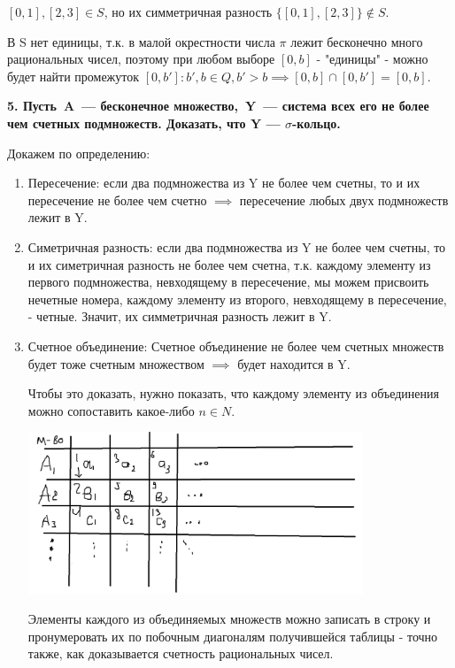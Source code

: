 \documentclass{article}
\begin{document}
$[0,1], [2,3] \in S$, но их симметричная разность $\{[0,1], [2,3]\} \notin S$.

В S нет единицы, т.к. в малой окрестности числа $\pi$ лежит бесконечно много рациональных чисел, поэтому при любом выборе $[0,b]$ - "единицы" - можно будет найти промежуток $[0,b'] : b', b \in Q, b' > b \implies [0,b] \cap [0,b'] = [0,b]$.

\noindent \textbf{5. Пусть A — бесконечное множество, Y — система всех его не более чем счетных подмножеств. Доказать, что Y — $\sigma$-кольцо.}

Докажем по определению:

\begin{enumerate}

\item Пересечение: если два подмножества из Y не более чем счетны, то и их пересечение не более чем счетно $\implies$ пересечение любых двух подмножеств лежит в Y.

\item Симетричная разность: если два подмножества из Y не более чем счетны, то и их симетричная разность не более чем счетна, т.к. каждому элементу из первого подмножества, невходящему в пересечение, мы можем присвоить нечетные номера, каждому элементу из второго, невходящему в пересечение, - четные. Значит, их симметричная разность лежит в Y.

\item Счетное объединение: 
Счетное объединение не более чем счетных множеств будет тоже счетным множеством $\implies$ будет находится в Y. 

Чтобы это доказать, нужно показать, что каждому элементу из объединения можно сопоставить какое-либо $n \in N$. 

\includegraphics[width=100mm]{Table}

Элементы каждого из объединяемых множеств можно записать в строку и пронумеровать их по побочным диагоналям получившейся таблицы - точно также, как доказывается счетность рациональных чисел. 

\end{enumerate}
\end{document}
